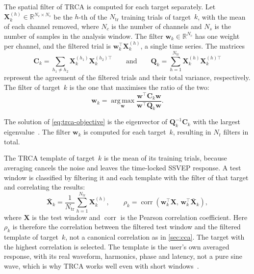 The spatial filter of \ac{TRCA} is computed for each target separately. 
Let $\mathbf{X}_k^{(h)} \in \mathbb{R}^{N_c \times N_s}$ be the $h$-th of the $N_\mathrm{tr}$
training trials of target~$k$, with the mean of each channel removed, where $N_c$ is the number of channels
and $N_s$ is the number of samples in the analysis window. 
The filter $\mathbf{w}_k \in \mathbb{R}^{N_c}$ has one weight per channel, and the filtered 
trial is $\mathbf{w}_k^\top \mathbf{X}_k^{(h)}$, a single time series. The matrices
\begin{equation}
    \mathbf{C}_k = \sum_{h_1 \neq h_2} \mathbf{X}_k^{(h_1)} \mathbf{X}_k^{(h_2)\top}
    \qquad \text{and} \qquad
    \mathbf{Q}_k = \sum_{h=1}^{N_\mathrm{tr}} \mathbf{X}_k^{(h)} \mathbf{X}_k^{(h)\top}
    \label{eq:trca-matrices}
\end{equation}
represent the agreement of the filtered trials and their total variance, respectively.
The filter of target~$k$ is the one that maximises the ratio of the two:
\begin{equation}
    \mathbf{w}_k = \operatorname*{arg\,max}_{\mathbf{w}}
    \frac{\mathbf{w}^\top \mathbf{C}_k \mathbf{w}}{\mathbf{w}^\top \mathbf{Q}_k \mathbf{w}}.
    \label{eq:trca-objective}
\end{equation}

The solution of \cref{eq:trca-objective} is the eigenvector of $\mathbf{Q}_k^{-1} \mathbf{C}_k$ 
with the largest eigenvalue~\citep{nakanishi2018trca}. The filter $\mathbf{w}_k$ is computed 
for each target~$k$, resulting in $N_t$ filters in total.

The \ac{TRCA} template of target~$k$ is the mean of its training trials, because averaging
cancels the noise and leaves the time-locked \ac{SSVEP} response. A test window is classified
by filtering it and each template with the filter of that target and correlating the results:
\begin{equation}
    \bar{\mathbf{X}}_k = \frac{1}{N_\mathrm{tr}} \sum_{h=1}^{N_\mathrm{tr}} \mathbf{X}_k^{(h)},
    \qquad
    \rho_k = \operatorname{corr}\left(\mathbf{w}_k^\top \mathbf{X},\,
                                      \mathbf{w}_k^\top \bar{\mathbf{X}}_k\right),
    \label{eq:trca-score}
\end{equation}
where $\mathbf{X}$ is the test window and $\operatorname{corr}$ is the Pearson correlation
coefficient. Here $\rho_k$ is therefore the correlation between the filtered test window and
the filtered template of target~$k$, not a canonical correlation as in \cref{sec:cca}. The
target with the highest correlation is selected. The template is the user's own averaged
response, with its real waveform, harmonics, phase and latency, not a pure sine wave, which is
why \ac{TRCA} works well even with short windows~\citep{nakanishi2018trca}.

